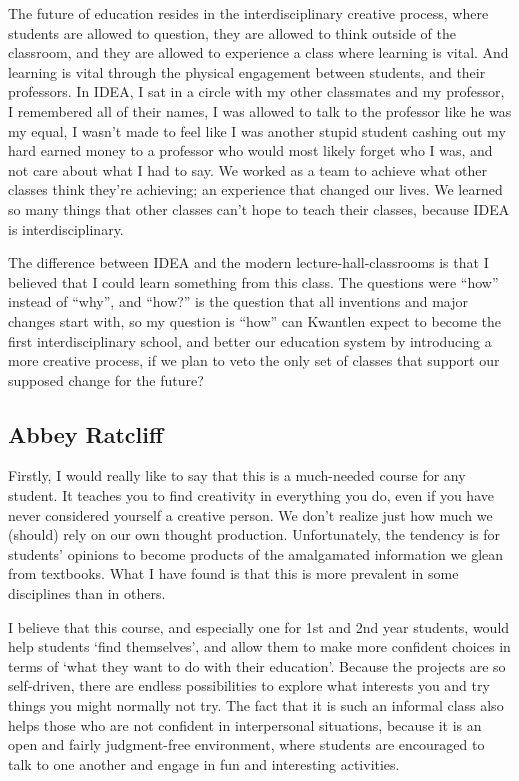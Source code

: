\documentclass[letterpaper,10pt,headsepline]{scrreprt}
\begin{document}
The future of education resides in the interdisciplinary creative process, where students are allowed to question, they are allowed to think outside of the classroom, and they are allowed to experience a class where learning is vital. And learning is vital through the physical engagement between students, and their professors. In IDEA, I sat in a circle with my other classmates and my professor, I remembered all of their names, I was allowed to talk to the professor like he was my equal, I wasn’t made to feel like I was another stupid student cashing out my hard earned money to a professor who would most likely forget who I was, and not care about what I had to say. We worked as a team to achieve what other classes think they’re achieving; an experience that changed our lives. We learned so many things that other classes can’t hope to teach their classes, because IDEA is interdisciplinary.

The difference between IDEA and the modern lecture-hall-classrooms is that I believed that I could learn something from this class. The questions were “how” instead of “why”, and “how?” is the question that all inventions and major changes start with, so my question is “how” can Kwantlen expect to become the first interdisciplinary school, and better our education system by introducing a more creative process, if we plan to veto the only set of classes that support our supposed change for the future?

\subsection{Abbey Ratcliff}

Firstly, I would really like to say that this is a much-needed course for any student. It teaches you to find creativity in everything you do, even if you have never considered yourself a creative person. We don’t realize just how much we (should) rely on our own thought production. Unfortunately, the tendency is for students’ opinions to become products of the amalgamated information we glean from textbooks. What I have found is that this is more prevalent in some disciplines than in others. 

I believe that this course, and especially one for 1st and 2nd year students, would help students ‘find themselves’, and allow them to make more confident choices in terms of ‘what they want to do with their education’. Because the projects are so self-driven, there are endless possibilities to explore what interests you and try things you might normally not try. The fact that it is such an informal class also helps those who are not confident in interpersonal situations, because it is an open and fairly judgment-free environment, where students are encouraged to talk to one another and engage in fun and interesting activities.
\end{document}
